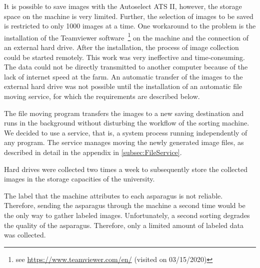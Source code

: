 \bigskip
It is possible to save images with the Autoselect ATS II, however, the storage space on the machine is very limited. Further, the selection of images to be saved is restricted to only 1000 images at a time.
One workaround to the problem is the installation of the Teamviewer software~\footnote{see \url{https://www.teamviewer.com/en/} (visited on 03/15/2020)} on the machine and the connection of an external hard drive. After the installation, the process of image collection could be started remotely. This work was very ineffective and time-consuming. The data could not be directly transmitted to another computer because of the lack of internet speed at the farm. An automatic transfer of the images to the external hard drive was not possible until the installation of an automatic file moving service, for which the requirements are described below.

The file moving program transfers the images to a new saving destination and runs in the background without disturbing the workflow of the sorting machine. We decided to use a service, that is, a system process running independently of any program. The service manages moving the newly generated image files, as described in detail in the appendix in \autoref{subsec:FileService}.

Hard drives were collected two times a week to subsequently store the collected images in the storage capacities of the university.

The label that the machine attributes to each asparagus is not reliable. Therefore, sending the asparagus through the machine a second time would be the only way to gather labeled images. Unfortunately, a second sorting degrades the quality of the asparagus. Therefore, only a limited amount of labeled data was collected. 

